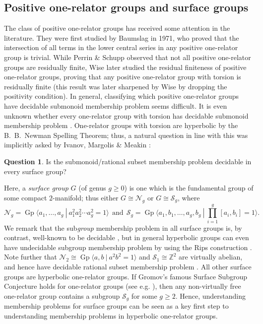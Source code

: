 \documentclass{amsart}
\newcommand{\Gpres}[2]{\operatorname{Gp}\bigl\langle #1\:|\:#2 \bigr\rangle}
\newcommand{\Z}{\mathbb{Z}}
\theoremstyle{plain}
\theoremstyle{definition}
\newtheorem{question}[theorem]{Question}
\begin{document}
\subsection{Positive one-relator groups and surface groups}\label{subsec_surface} 



The class of positive one-relator groups has received some attention in the literature. They were first studied by Baumslag \cite{Baumslag1971} in 1971, who proved that the intersection of all terms in the lower central series in any positive one-relator group is trivial. While Perrin \& Schupp \cite{Perrin1984} observed that not all positive one-relator groups are residually finite, Wise \cite{Wise2001} later studied the residual finiteness of positive one-relator groups, proving that any positive one-relator group with torsion is residually finite (this result was later sharpened by Wise \cite{Wise2021} by dropping the positivity condition). In general, classifying which positive one-relator groups have decidable submonoid membership problem seems difficult. It is even unknown whether every one-relator group with torsion has decidable submonoid membership problem \cite[Questions~20.68 \& 20.69]{Kourovka2020}. One-relator groups with torsion are hyperbolic by the B.~B.~Newman Spelling Theorem; thus, a natural question in line with this was implicitly asked by Ivanov, Margolis \& Meakin \cite[p. 110]{Ivanov2001}: 

\begin{question}\label{Quest:Surface-group-smmp}
Is the submonoid/rational subset membership problem decidable in every surface group? 
\end{question}

Here, a \textit{surface group} $G$ (of genus $g \geq 0$) is one which is the fundamental group of some compact $2$-manifold; thus either $G \cong \mathcal{N}_g$ or $G \cong \mathcal{S}_g$, where
\[
\mathcal{N}_g = \Gpres{a_1, \dots, a_g}{a_1^2 a_2^2 \cdots a_g^2 = 1} \:\: \text{and} \:\: \mathcal{S}_g = \Gpres{a_1, b_1, \dots, a_g, b_g}{\prod_{i=1}^g [a_i, b_i] = 1}.
\]
We remark that the sub\textit{group} membership problem in all surface groups is, by contrast, well-known to be decidable \cite{Scott1978}, but in general hyperbolic groups can even have undecidable subgroup membership problem by using the Rips construction \cite{Rips1982}. Note further that $\mathcal{N}_2 \cong \Gpres{a,b}{a^2b^2 = 1}$ and $\mathcal{S}_1 \cong \Z^2$ are virtually abelian, and hence have decidable rational subset membership problem \cite{Grunschlag1999}. All other surface groups are hyperbolic one-relator groups. If Gromov's famous Surface Subgroup Conjecture holds for one-relator groups (see e.g. \cite{Gordon2010}), then any non-virtually free one-relator group contains a subgroup $\mathcal{S}_g$ for some $g \geq 2$. Hence, understanding membership problems for surface groups can be seen as a key first step to understanding membership problems in hyperbolic one-relator groups. 
\end{document}
